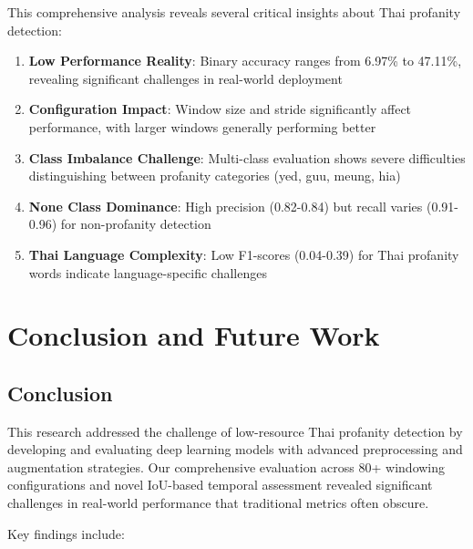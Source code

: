 \documentclass[11pt]{article}
\begin{document}
This comprehensive analysis reveals several critical insights about Thai profanity detection:

\begin{enumerate}
    \item \textbf{Low Performance Reality}: Binary accuracy ranges from 6.97\% to 47.11\%, revealing significant challenges in real-world deployment
    \item \textbf{Configuration Impact}: Window size and stride significantly affect performance, with larger windows generally performing better
    \item \textbf{Class Imbalance Challenge}: Multi-class evaluation shows severe difficulties distinguishing between profanity categories (yed, guu, meung, hia)
    \item \textbf{None Class Dominance}: High precision (0.82-0.84) but recall varies (0.91-0.96) for non-profanity detection
    \item \textbf{Thai Language Complexity}: Low F1-scores (0.04-0.39) for Thai profanity words indicate language-specific challenges
\end{enumerate}

\section{Conclusion and Future Work}
\subsection{Conclusion}
This research addressed the challenge of low-resource Thai profanity detection by developing and evaluating deep learning models with advanced preprocessing and augmentation strategies. Our comprehensive evaluation across 80+ windowing configurations and novel IoU-based temporal assessment revealed significant challenges in real-world performance that traditional metrics often obscure.

Key findings include:
\end{document}
